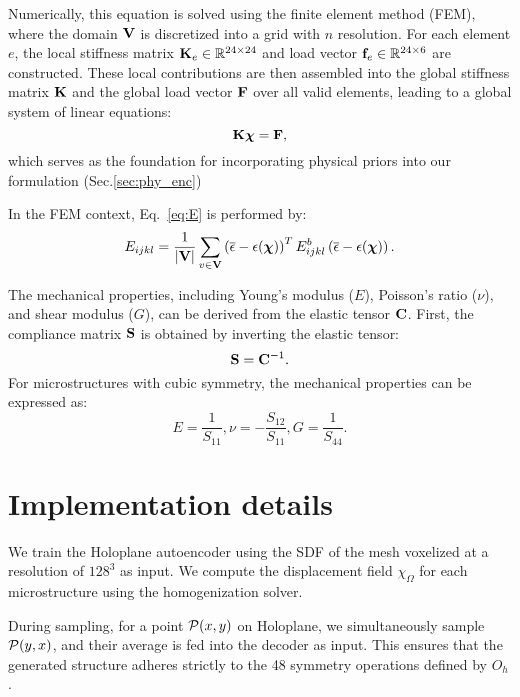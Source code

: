 Numerically, this equation is solved using the finite element method (FEM), where the domain $\mathbf{V}$ is discretized into a grid with $n$ resolution. 
For each element $e$, the local stiffness matrix $\mathbf{K}_e \in \mathbb{R}^{24\times24}$ and load vector $\mathbf{f}_e \in \mathbb{R}^{24\times6}$ are constructed. 
These local contributions are then assembled into the global stiffness matrix $\mathbf{K}$ and the global load vector $\mathbf{F}$ over all valid elements, leading to a global system of linear equations:
\begin{equation}
    \mathbf{K}\boldsymbol{\chi} = \mathbf{F},
\end{equation}
which serves as the foundation for incorporating physical priors into our formulation (Sec.\ref{sec:phy_enc})

In the FEM context, Eq.~\ref{eq:E} is performed by:
\begin{equation}
        E_{ijkl} = \frac{1}{|\mathbf{V}|} \sum_{v \in \mathbf{V}} \left( \overline{\epsilon} - \epsilon(\boldsymbol{\chi}) \right)^T  E^b_{ijkl} \left(\overline{\epsilon} - \epsilon(\boldsymbol{\chi}) \right).
\end{equation}


The mechanical properties, including Young’s modulus ($E$), Poisson’s ratio ($\nu$), and shear modulus ($G$), can be derived from the elastic tensor $\mathbf{C}$.
First, the compliance matrix $\mathbf{S}$ is obtained by inverting the elastic tensor:
\begin{equation}
\mathbf{S} = \mathbf{C}^{-1}.
\end{equation}
For microstructures with cubic symmetry, the mechanical properties can be expressed as:
\begin{equation}
    E=\frac{1}{S_{11}}, \nu = -\frac{S_{12}}{S_{11}}, G=\frac{1}{S_{44}}.
\end{equation}


\section{Implementation details}
\label{sec:imple_detail}
We train the Holoplane autoencoder using the SDF of the mesh voxelized at a resolution of $128^3$ as input.
We compute the displacement field $\chi_\Omega$ for each microstructure using the homogenization solver.

During sampling, for a point $\mathcal{P}(x, y)$ on Holoplane, we simultaneously sample $\mathcal{P}(y, x)$, and their average is fed into the decoder as input. 
This ensures that the generated structure adheres strictly to the 48 symmetry operations defined by $O_h$.


